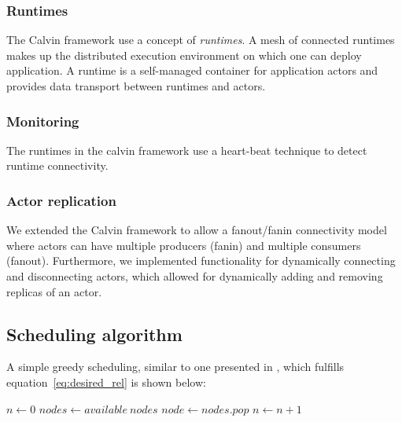 \documentclass{cslthse-msc}
\begin{document}
\subsubsection{Runtimes}
The Calvin framework use a concept of \emph{runtimes}. A mesh of connected runtimes makes up the distributed execution environment on which one can deploy application. A runtime is a self-managed container for application actors and provides data transport between runtimes and actors.

\subsubsection{Monitoring}
The runtimes in the calvin framework use a heart-beat technique to detect runtime connectivity.

\subsubsection{Actor replication}
We extended the Calvin framework to allow a fanout/fanin connectivity model where actors can have multiple producers (fanin) and multiple consumers (fanout). Furthermore, we implemented functionality for dynamically connecting and disconnecting actors, which allowed for dynamically adding and removing replicas of an actor.

\subsection{Scheduling algorithm}
A simple greedy scheduling, similar to one presented in \cite{effTaskReplMobGrid}, which fulfills equation~\ref{eq:desired_rel} is shown below:


\begin{algorithmic}
\State $n\gets 0$
\State $nodes\gets available\ nodes$
	\State $node\gets nodes.pop$
	\State $n\gets n + 1$
\EndWhile
\end{algorithmic}
\end{document}
